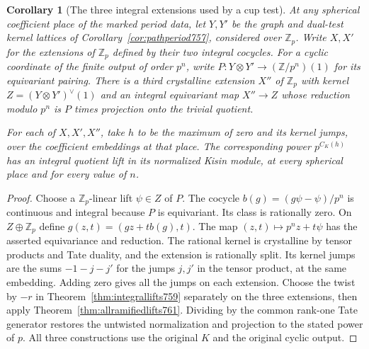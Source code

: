 \documentclass[a4paper,11pt]{article}
\newtheorem{corollary}[proposition]{Corollary}
\theoremstyle{definition}
\theoremstyle{remark}
\newcommand{\ZZ}{\mathbb Z}\newcommand{\ord}{\operatorname{ord}}
\numberwithin{equation}{section}
\begin{document}
\begin{corollary}[The three integral extensions used by a cup test]
\leavevmode\label{cor:threeextensions761}
At any spherical coefficient place of the marked period data,
let \(Y,Y'\) be the graph and dual-test kernel lattices of
Corollary~\ref{cor:pathperiod757}, considered over \(\ZZ_p\).
Write \(X,X'\) for the extensions of \(\ZZ_p\) defined by
their two integral cocycles. For a cyclic coordinate of the
finite output of order \(p^n\), write
\(P:Y\otimes Y'\to(\ZZ/p^n)(1)\) for its equivariant
pairing. There is a third crystalline extension \(X''\)
of \(\ZZ_p\) with kernel \(Z=(Y\otimes Y')^\vee(1)\) and an
integral equivariant map \(X''\to Z\) whose reduction modulo
\(p^n\) is \(P\) times projection onto the trivial quotient.

For each of \(X,X',X''\), take \(h\) to be the maximum of zero
and its kernel jumps, over the coefficient embeddings at
that place. The corresponding power \(p^{C_K(h)}\) has an
integral quotient lift in its normalized Kisin module, at
every spherical place and for every value of \(n\).
\end{corollary}
\begin{proof}
Choose a \(\ZZ_p\)-linear lift \(\psi\in Z\) of \(P\). The
cocycle \(b(g)=(g\psi-\psi)/p^n\) is continuous and integral
because \(P\) is equivariant. Its class is rationally zero.
On \(Z\oplus\ZZ_p\) define
\(g(z,t)=(gz+t b(g),t)\). The map \((z,t)\mapsto p^n z+t\psi\)
has the asserted equivariance and reduction. The rational
kernel is crystalline by tensor products and Tate duality,
and the extension is rationally split. Its kernel jumps are
the sums \(-1-j-j'\) for the jumps \(j,j'\) in the tensor
product, at the same embedding. Adding zero gives all the
jumps on each extension. Choose the twist by \(-r\) in
Theorem~\ref{thm:integrallifts759} separately on the three
extensions, then apply Theorem~\ref{thm:allramifiedlifts761}.
Dividing by the common rank-one Tate generator restores the
untwisted normalization and projection to the stated power
of \(p\). All three constructions use the original \(K\)
and the original cyclic output.
\end{proof}
\clearpage
\end{document}
